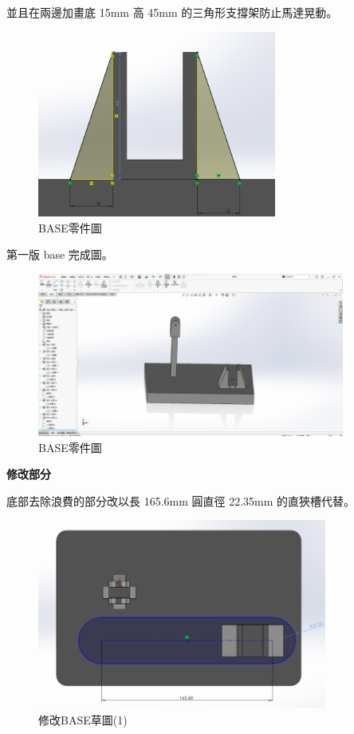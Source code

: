並且在兩邊加畫底 15mm 高 45mm 的三角形支撐架防止馬達晃動。

\begin{figure}[htbp]
    \centering
    \includegraphics[width=0.70\textwidth]{./../images/6-1-35}
    \caption{BASE零件圖}
\end{figure}

第一版 base 完成圖。

\begin{figure}[htbp]
    \centering
    \includegraphics[width=0.9\textwidth]{./../images/6-1-36}
    \caption{BASE零件圖}
\end{figure}

\newpage

\textbf{修改部分}

底部去除浪費的部分改以長 165.6mm 圓直徑 22.35mm 的直狹槽代替。

\begin{figure}[htbp]
    \centering
    \includegraphics[width=0.85\textwidth]{./../images/6-1-37}
    \caption{修改BASE草圖(1)}
\end{figure}

